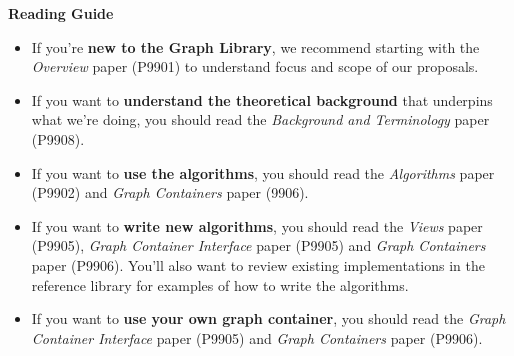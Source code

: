 \textbf{Reading Guide} 
\begin{itemize}
  \item If you're \textbf{new to the Graph Library}, we recommend starting with the \textit{Overview} paper (P9901) to understand focus and scope of our proposals.
  \item If you want to \textbf{understand the theoretical background} that underpins what we're doing, you should read the \textit{Background and Terminology} paper (P9908).
  \item If you want to \textbf{use the algorithms}, you should read the \textit{Algorithms} paper (P9902) and \textit{Graph Containers} paper (9906).
  \item If you want to \textbf{write new algorithms}, you should read the \textit{Views} paper (P9905), \textit{Graph Container Interface} paper (P9905) and \textit{Graph Containers} paper (P9906).
        You'll also want to review existing implementations in the reference library for examples of how to write the algorithms.
  \item If you want to \textbf{use your own graph container}, you should read the \textit{Graph Container Interface} paper (P9905) and \textit{Graph Containers} paper (P9906).
\end{itemize}

  
%
